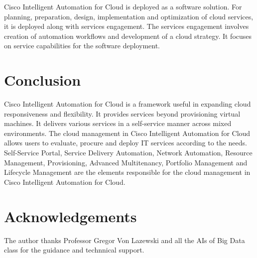 \documentclass[9pt,twocolumn,twoside]{../../styles/osajnl}
\begin{document}
Cisco Intelligent Automation for Cloud is deployed as a software
solution. For planning, preparation, design, implementation and
optimization of cloud services, it is deployed along with services
engagement. The services engagement involves creation of automation
workflows and development of a cloud strategy. It focuses on service
capabilities for the software deployment.

\section{Conclusion}

Cisco Intelligent Automation for Cloud is a framework useful in
expanding cloud responsiveness and flexibility. It provides services
beyond provisioning virtual machines. It delivers various services in
a self-service manner across mixed environments. The cloud management
in Cisco Intelligent Automation for Cloud allows users to evaluate,
procure and deploy IT services according to the needs. Self-Service
Portal, Service Delivery Automation, Network Automation, Resource
Management, Provisioning, Advanced Multitenancy, Portfolio Management
and Lifecycle Management are the elements responsible for the cloud
management in Cisco Intelligent Automation for Cloud.
\section{Acknowledgements}

The author thanks Professor Gregor Von Lazewski and all the AIs of Big
Data class for the guidance and technnical \SE support.





\end{document}
